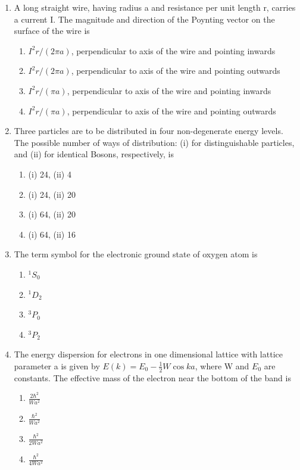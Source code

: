 \documentclass[journal,12pt,onecolumn]{IEEEtran}
\theoremstyle{remark}
\begin{document}
\begin{enumerate}
    \item A long straight wire, having radius a and resistance per unit length r, carries a current I. The magnitude and direction of the Poynting vector on the surface of the wire is
    \hfill{} \begin{enumerate}
        \item $I^2r/(2\pi a)$, perpendicular to axis of the wire and pointing inwards
        \item $I^2r/(2\pi a)$, perpendicular to axis of the wire and pointing outwards
        \item $I^2r/(\pi a)$, perpendicular to axis of the wire and pointing inwards
        \item $I^2r/(\pi a)$, perpendicular to axis of the wire and pointing outwards
    \end{enumerate}

    \item Three particles are to be distributed in four non-degenerate energy levels. The possible number of ways of distribution: (i) for distinguishable particles, and (ii) for identical Bosons, respectively, is
    \hfill{} \begin{enumerate}
        \item (i) 24, (ii) 4
        \item (i) 24, (ii) 20
        \item (i) 64, (ii) 20
        \item (i) 64, (ii) 16
    \end{enumerate}

    \item The term symbol for the electronic ground state of oxygen atom is
    \hfill{} \begin{enumerate}
        \item $^1S_0$
        \item $^1D_2$
        \item $^3P_0$
        \item $^3P_2$
    \end{enumerate}

    \item The energy dispersion for electrons in one dimensional lattice with lattice parameter a is given by $E(k) = E_0 - \frac{1}{2}W \cos ka$, where W and $E_0$ are constants. The effective mass of the electron near the bottom of the band is
    \hfill{} \begin{enumerate}
        \item $\frac{2\hbar^2}{Wa^2}$
        \item $\frac{\hbar^2}{Wa^2}$
        \item $\frac{\hbar^2}{2Wa^2}$
        \item $\frac{\hbar^2}{4Wa^2}$
    \end{enumerate}


\end{enumerate}
\end{document}
